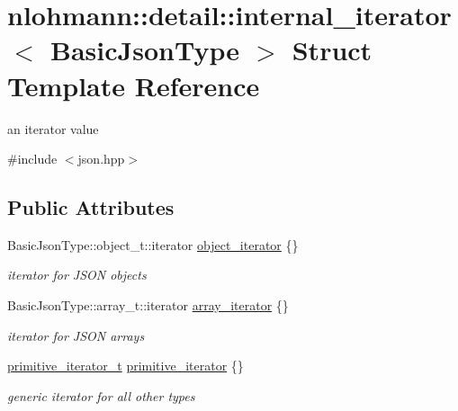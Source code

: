 \hypertarget{structnlohmann_1_1detail_1_1internal__iterator}{}\section{nlohmann\+:\+:detail\+:\+:internal\+\_\+iterator$<$ Basic\+Json\+Type $>$ Struct Template Reference}
\label{structnlohmann_1_1detail_1_1internal__iterator}


an iterator value  




{\ttfamily \#include $<$json.\+hpp$>$}

\subsection*{Public Attributes}
\begin{DoxyCompactItemize}
\item 
\mbox{\label{structnlohmann_1_1detail_1_1internal__iterator_a8cb0af3498061426c1d0a65ad6220408}} 
Basic\+Json\+Type\+::object\+\_\+t\+::iterator \mbox{\hyperlink{structnlohmann_1_1detail_1_1internal__iterator_a8cb0af3498061426c1d0a65ad6220408}{object\+\_\+iterator}} \{\}
\begin{DoxyCompactList}\small\item\em iterator for J\+S\+ON objects \end{DoxyCompactList}\item 
\mbox{\label{structnlohmann_1_1detail_1_1internal__iterator_a8294a6e6f01b58e1cce8fbae66a50b5d}} 
Basic\+Json\+Type\+::array\+\_\+t\+::iterator \mbox{\hyperlink{structnlohmann_1_1detail_1_1internal__iterator_a8294a6e6f01b58e1cce8fbae66a50b5d}{array\+\_\+iterator}} \{\}
\begin{DoxyCompactList}\small\item\em iterator for J\+S\+ON arrays \end{DoxyCompactList}\item 
\mbox{\label{structnlohmann_1_1detail_1_1internal__iterator_a2b3bb45f968210e42c282017eeeb63a8}} 
\mbox{\hyperlink{classnlohmann_1_1detail_1_1primitive__iterator__t}{primitive\+\_\+iterator\+\_\+t}} \mbox{\hyperlink{structnlohmann_1_1detail_1_1internal__iterator_a2b3bb45f968210e42c282017eeeb63a8}{primitive\+\_\+iterator}} \{\}
\begin{DoxyCompactList}\small\item\em generic iterator for all other types \end{DoxyCompactList}\end{DoxyCompactItemize}


